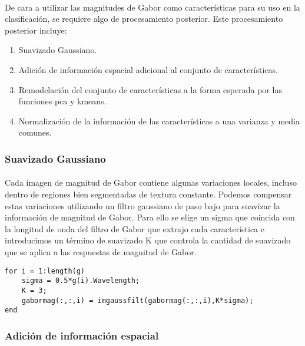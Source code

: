 \documentclass[es,gi]{ifirak}\usepackage[]{graphicx}\usepackage[]{color}
\begin{document}
\paragraph{} De cara a utilizar las magnitudes de Gabor como características para su uso en la clasificación, se requiere algo de procesamiento posterior. Este procesamiento posterior incluye:
\begin{enumerate}
\item Suavizado Gaussiano.
\item Adición de información espacial adicional al conjunto de características.
\item Remodelación del conjunto de características a la forma esperada por las funciones pca y kmeans. 
\item Normalización de la información de las características a una varianza y media comunes.
\end{enumerate}

\subsubsection{Suavizado Gaussiano}
\paragraph{} Cada imagen de magnitud de Gabor contiene algunas variaciones locales, incluso dentro de regiones bien segmentadas de textura constante. Podemos compensar estas variaciones utilizando un filtro gaussiano de paso bajo para suavizar la información de magnitud de Gabor. Para ello se elige un sigma que coincida con la longitud de onda del filtro de Gabor que extrajo cada característica e introducimos un término de suavizado K que controla la cantidad de suavizado que se aplica a las respuestas de magnitud de Gabor.
\begin{lstlisting}
for i = 1:length(g)
    sigma = 0.5*g(i).Wavelength;
    K = 3;
    gabormag(:,:,i) = imgaussfilt(gabormag(:,:,i),K*sigma); 
end
\end{lstlisting}

\subsubsection{Adición de información espacial}
\end{document}

